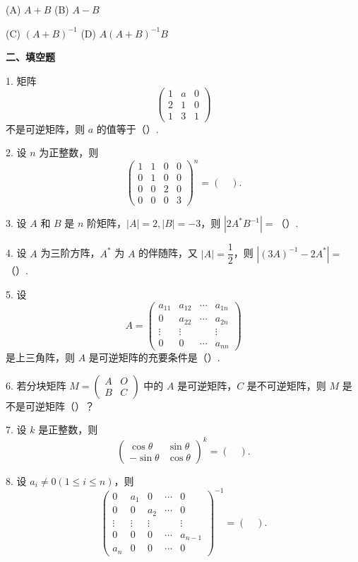\documentclass[UTF8, 12pt, fontset=fandol, oneside]{ctexart}
\begin{document}
(A) $A+B$\qquad
(B) $A-B$

(C) $(A+B)^{-1}$\qquad
(D) $A(A+B)^{-1}B$

\noindent\textbf{二、填空题}

1. 矩阵
\[
\left(
\begin{array}{ccc}
1 & a & 0\\
2 & 1 & 0\\
1 & 3 & 1
\end{array}
\right)
\]
不是可逆矩阵，则 $a$ 的值等于（\quad ）.

2. 设 $n$ 为正整数，则
\[
\left(
\begin{array}{cccc}
1 & 1 & 0 & 0\\
0 & 1 & 0 & 0\\
0 & 0 & 2 & 0\\
0 & 0 & 0 & 3
\end{array}
\right)^n
=\left(\quad\right).
\]

3. 设 $A$ 和 $B$ 是 $n$ 阶矩阵，$|A|=2, |B|=-3$，则 $|2A^*B^{-1}|=$（\quad ）.

4. 设 $A$ 为三阶方阵，$A^*$ 为 $A$ 的伴随阵，又 $|A|=\dfrac12$，则 $|(3A)^{-1}-2A^*|=$（\quad ）.

5. 设
\[
A=
\left(
\begin{array}{cccc}
a_{11} & a_{12} & \cdots & a_{1n}\\
0 & a_{22} & \cdots & a_{2n}\\
\vdots & \vdots & & \vdots\\
0 & 0 & \cdots & a_{nn}
\end{array}
\right)
\]
是上三角阵，则 $A$ 是可逆矩阵的充要条件是（\quad ）.

6. 若分块矩阵 $M=
\left(
\begin{array}{cc}
A & O\\
B & C
\end{array}
\right)$ 中的 $A$ 是可逆矩阵，$C$ 是不可逆矩阵，则 $M$ 是不是可逆矩阵（\quad ）？

7. 设 $k$ 是正整数，则
\[
\left(
\begin{array}{cc}
\cos\theta & \sin\theta\\
-\sin\theta & \cos\theta
\end{array}
\right)^k
=\left(\quad\right).
\]

8. 设 $a_i\ne0(1\le i\le n)$，则
\[
\left(
\begin{array}{ccccc}
0 & a_1 & 0 & \cdots & 0\\
0 & 0 & a_2 & \cdots & 0\\
\vdots & \vdots & \vdots & & \vdots\\
0 & 0 & 0 & \cdots & a_{n-1}\\
a_n & 0 & 0 & \cdots & 0
\end{array}
\right)^{-1}
=\left(\quad\right).
\]
\end{document}
